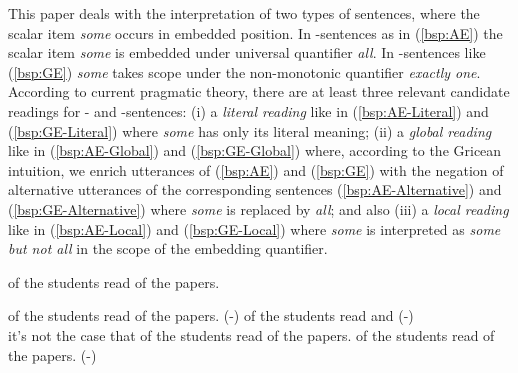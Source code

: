 \documentclass[fleqn,reqno,10pt,draft]{article}
\newcommand{\lit}{\acro{lit}}
\newcommand{\glb}{\acro{glb}}
\newcommand{\loc}{\acro{loc}}
\newcommand{\as}{\acro{as}}
\renewcommand{\es}{\acro{es}}
\begin{document}


This paper deals with the interpretation of two types of sentences,
where the scalar item \emph{some} occurs in embedded position. In
\as-sentences as in (\ref{bsp:AE}) the scalar item \emph{some} is
embedded under universal quantifier \emph{all}. In \es-sentences like
(\ref{bsp:GE}) \emph{some} takes scope under the non-monotonic
quantifier \emph{exactly one}. According to current pragmatic theory, there are at
least three relevant candidate readings for \as- and \es-sentences:
(i) a \emph{literal reading} like in (\ref{bsp:AE-Literal}) and
(\ref{bsp:GE-Literal}) where \emph{some} has only its literal meaning;
(ii) a \emph{global reading} like in (\ref{bsp:AE-Global}) and
(\ref{bsp:GE-Global}) where, according to the Gricean intuition, we
enrich utterances of (\ref{bsp:AE}) and (\ref{bsp:GE}) with the
negation of alternative utterances of the corresponding sentences
(\ref{bsp:AE-Alternative}) and (\ref{bsp:GE-Alternative}) where
\emph{some} is replaced by \emph{all}; and also (iii) a \emph{local
  reading} like in (\ref{bsp:AE-Local}) and (\ref{bsp:GE-Local}) where
\emph{some} is interpreted as \emph{some but not all} in the scope of
the embedding quantifier.


\begin{exe}
  \ex \label{bsp:AE}  of the students read {} of the
  papers. \hfill{\as}

  \begin{xlist}
  \ex \label{bsp:AE-Literal}  of the students read
    {} of the papers. \hfill (\as-\lit)
  \ex \label{bsp:AE-Global}
     of the students read  
    and  \hfill (\as-\glb)\\
    it's not the case that  of the students read  of the papers.
  \ex \label{bsp:AE-Local}
     of the students read {} of the
    papers. \hfill (\as-\loc)
  \end{xlist}
\end{exe}
\end{document}
